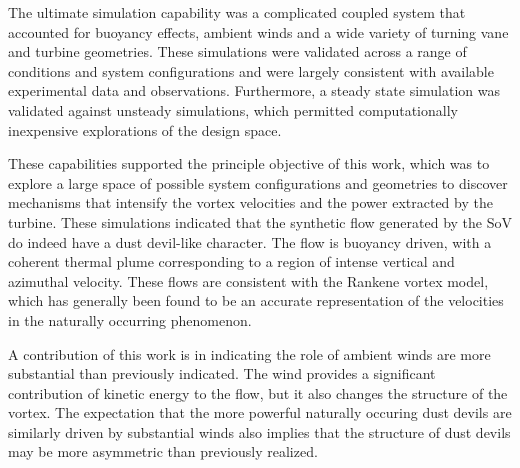 The ultimate simulation capability was a complicated coupled system that
accounted for buoyancy effects, ambient winds and a wide variety of
turning vane and turbine geometries. These simulations were validated
across a range of conditions and system configurations and were largely
consistent with available experimental data and
observations. Furthermore, a steady state simulation was validated
against unsteady simulations, which permitted computationally
inexpensive explorations of the design space. 




These capabilities supported the principle objective of this work, which
was to explore a large space of possible system configurations and
geometries to discover mechanisms that intensify the vortex velocities
and the power extracted by the turbine. These simulations indicated that
the synthetic flow generated by the SoV do indeed have a dust
devil-like character. The flow is buoyancy driven, with a coherent
thermal plume corresponding to a region of intense vertical and
azimuthal velocity. These flows are consistent with the Rankene
vortex model, which has generally been found to be an accurate
representation of the velocities in the naturally occurring phenomenon. 

A contribution of this work is in indicating the role of
ambient winds are more substantial than previously indicated. The wind
provides a significant contribution of kinetic energy to the flow, but it
also changes the structure of the vortex. The expectation that the more
powerful naturally occuring dust devils are similarly driven by substantial 
winds also implies that the structure of dust devils may be more 
asymmetric than previously realized. 


